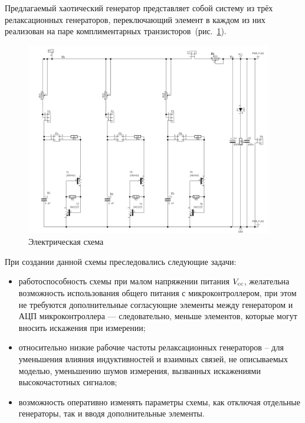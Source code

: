 Предлагаемый хаотический генератор представляет собой
систему из трёх релаксационных генераторов,
переключающий элемент в каждом из них реализован
на паре комплиментарных транзисторов~(рис.~\ref{atu:f:relax3d_schem}).

\begin{figure}[htb!]
  \centerline{\includegraphics[width=0.96\textwidth]{p/relax3d_schem.png} }
  \caption{Электрическая схема \RelaxBjtIi}
  \label{atu:f:relax3d_schem}
\end{figure}

При создании данной схемы преследовались следующие задачи:
\begin{itemize}

  \item
    работоспособность схемы при малом напряжении питания $V_\mathrm{cc}$,
    желательна возможность использования общего питания с микроконтроллером,
    при этом не требуются дополнительные согласующие элементы
    между генератором и АЦП микроконтроллера --- следовательно,
    меньше элементов, которые могут вносить искажения при измерении;

  \item
    относительно низкие рабочие частоты релаксационных генераторов --
    для уменьшения влияния индуктивностей и взаимных связей, не описываемых моделью,
    уменьшению шумов измерения, вызванных искажениями высокочастотных сигналов;

  \item
    возможность оперативно изменять параметры схемы, как отключая отдельные генераторы,
    так и вводя дополнительные элементы.

\end{itemize}

